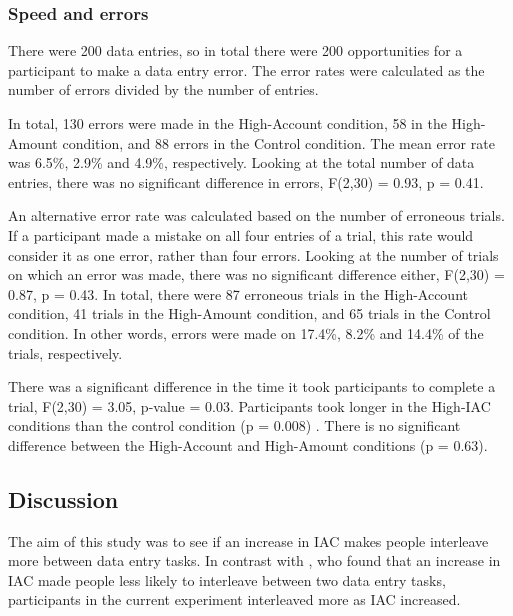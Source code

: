 \begin{table}
\begin{itemize}
\subsubsection{Speed and errors}
There were 200 data entries, so in total there were 200 opportunities for a participant to make a data entry error. The error rates were calculated as the number of errors divided by the number of entries. 

In total, 130 errors were made in the High-Account condition, 58 in the High-Amount condition, and 88 errors in the Control condition. The mean error rate was 6.5\%, 2.9\% and 4.9\%, respectively. 
Looking at the total number of data entries, there was no significant difference in errors, F(2,30) = 0.93, p = 0.41.

An alternative error rate was calculated based on the number of erroneous trials. If a participant made a mistake on all four entries of a trial, this rate would consider it as one error, rather than four errors. Looking at the number of trials on which an error was made, there was no significant difference either, F(2,30) = 0.87, p = 0.43. In total, there were 87 erroneous trials in the High-Account condition, 41 trials in the High-Amount condition, and 65 trials in the Control condition. In other words, errors were made on 17.4\%, 8.2\% and 14.4\% of the trials, respectively. 

There was a significant difference in the time it took participants to complete a trial, F(2,30) = 3.05, p-value = 0.03. Participants took longer in the High-IAC conditions than the control condition  (p = 0.008) . There is no significant difference between the High-Account and High-Amount conditions (p = 0.63).

\subsection{Discussion}
The aim of this study was to see if an increase in IAC makes people interleave more between data entry tasks. In contrast with \citet{Back2012}, who found that an increase in IAC made people less likely to interleave between two data entry tasks, participants in the current experiment interleaved more as IAC increased.


\end{itemize}
\end{table}
